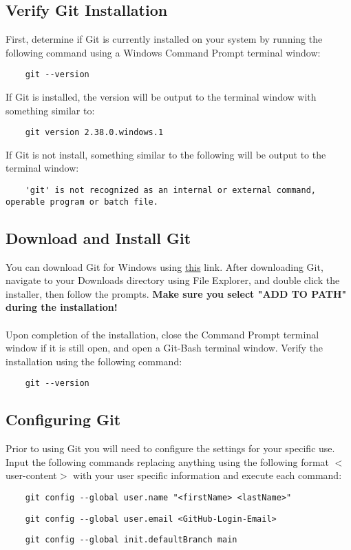 \documentclass{article}
\begin{document}
\subsection*{Verify Git Installation}
First, determine if Git is currently installed on your system by running the following command using a Windows Command Prompt terminal window:
\begin{verbatim}
    git --version
\end{verbatim}
If Git is installed, the version will be output to the terminal window with something similar to:
\begin{verbatim}
    git version 2.38.0.windows.1
\end{verbatim}
If Git is not install, something similar to the following will be output to the terminal window:
\begin{verbatim}
    'git' is not recognized as an internal or external command,
operable program or batch file.
\end{verbatim}

\subsection*{Download and Install Git}
You can download Git for Windows using \href{https://git-scm.com/download/win}{this} link. After downloading Git, navigate to your Downloads directory using File Explorer, and double click the installer, then follow the prompts. \textbf{Make sure you select "ADD TO PATH" during the installation!}\\\\
Upon completion of the installation, close the Command Prompt terminal window if it is still open, and open a Git-Bash terminal window. Verify the installation using the following command:
\begin{verbatim}
    git --version
\end{verbatim}

\subsection*{Configuring Git}
Prior to using Git you will need to configure the settings for your specific use. Input the following commands replacing anything using the following format $<$user-content$>$ with your user specific information and execute each command: 
\begin{verbatim}
    git config --global user.name "<firstName> <lastName>"
\end{verbatim}
\begin{verbatim}
    git config --global user.email <GitHub-Login-Email>
\end{verbatim}
\begin{verbatim}
    git config --global init.defaultBranch main
\end{verbatim}
\end{document}

